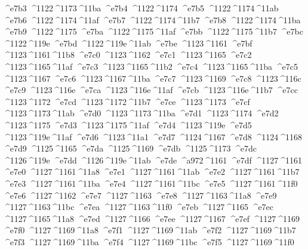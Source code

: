 \checkit ^^^^e7b3 ^^^^1122^^^^1173^^^^11ba
\checkit ^^^^e7b4 ^^^^1122^^^^1174
\checkit ^^^^e7b5 ^^^^1122^^^^1174^^^^11ab
\checkit ^^^^e7b6 ^^^^1122^^^^1174^^^^11af
\checkit ^^^^e7b7 ^^^^1122^^^^1174^^^^11b7
\checkit ^^^^e7b8 ^^^^1122^^^^1174^^^^11ba
\checkit ^^^^e7b9 ^^^^1122^^^^1175
\checkit ^^^^e7ba ^^^^1122^^^^1175^^^^11af
\checkit ^^^^e7bb ^^^^1122^^^^1175^^^^11b7
\checkit ^^^^e7bc ^^^^1122^^^^119e
\checkit ^^^^e7bd ^^^^1122^^^^119e^^^^11ab
\checkit ^^^^e7be ^^^^1123^^^^1161
\checkit ^^^^e7bf ^^^^1123^^^^1161^^^^11b8
\checkit ^^^^e7c0 ^^^^1123^^^^1162
\checkit ^^^^e7c1 ^^^^1123^^^^1165
\checkit ^^^^e7c2 ^^^^1123^^^^1165^^^^11af
\checkit ^^^^e7c3 ^^^^1123^^^^1165^^^^11b2
\checkit ^^^^e7c4 ^^^^1123^^^^1165^^^^11ba
\checkit ^^^^e7c5 ^^^^1123^^^^1167
\checkit ^^^^e7c6 ^^^^1123^^^^1167^^^^11ba
\checkit ^^^^e7c7 ^^^^1123^^^^1169
\checkit ^^^^e7c8 ^^^^1123^^^^116c
\checkit ^^^^e7c9 ^^^^1123^^^^116e
\checkit ^^^^e7ca ^^^^1123^^^^116e^^^^11af
\checkit ^^^^e7cb ^^^^1123^^^^116e^^^^11b7
\checkit ^^^^e7cc ^^^^1123^^^^1172
\checkit ^^^^e7cd ^^^^1123^^^^1172^^^^11b7
\checkit ^^^^e7ce ^^^^1123^^^^1173
\checkit ^^^^e7cf ^^^^1123^^^^1173^^^^11ab
\checkit ^^^^e7d0 ^^^^1123^^^^1173^^^^11ba
\checkit ^^^^e7d1 ^^^^1123^^^^1174
\checkit ^^^^e7d2 ^^^^1123^^^^1175
\checkit ^^^^e7d3 ^^^^1123^^^^1175^^^^11af
\checkit ^^^^e7d4 ^^^^1123^^^^119e
\checkit ^^^^e7d5 ^^^^1123^^^^119e^^^^11af
\checkit ^^^^e7d6 ^^^^1123^^^^11a1
\checkit ^^^^e7d7 ^^^^1124^^^^1167
\checkit ^^^^e7d8 ^^^^1124^^^^1168
\checkit ^^^^e7d9 ^^^^1125^^^^1165
\checkit ^^^^e7da ^^^^1125^^^^1169
\checkit ^^^^e7db ^^^^1125^^^^1173
\checkit ^^^^e7dc ^^^^1126^^^^119e
\checkit ^^^^e7dd ^^^^1126^^^^119e^^^^11ab
\checkit ^^^^e7de ^^^^a972^^^^1161
\checkit ^^^^e7df ^^^^1127^^^^1161
\checkit ^^^^e7e0 ^^^^1127^^^^1161^^^^11a8
\checkit ^^^^e7e1 ^^^^1127^^^^1161^^^^11ab
\checkit ^^^^e7e2 ^^^^1127^^^^1161^^^^11b7
\checkit ^^^^e7e3 ^^^^1127^^^^1161^^^^11ba
\checkit ^^^^e7e4 ^^^^1127^^^^1161^^^^11bc
\checkit ^^^^e7e5 ^^^^1127^^^^1161^^^^11f0
\checkit ^^^^e7e6 ^^^^1127^^^^1162
\checkit ^^^^e7e7 ^^^^1127^^^^1163
\checkit ^^^^e7e8 ^^^^1127^^^^1163^^^^11a8
\checkit ^^^^e7e9 ^^^^1127^^^^1163^^^^11bc
\checkit ^^^^e7ea ^^^^1127^^^^1163^^^^11f0
\checkit ^^^^e7eb ^^^^1127^^^^1165
\checkit ^^^^e7ec ^^^^1127^^^^1165^^^^11a8
\checkit ^^^^e7ed ^^^^1127^^^^1166
\checkit ^^^^e7ee ^^^^1127^^^^1167
\checkit ^^^^e7ef ^^^^1127^^^^1169
\checkit ^^^^e7f0 ^^^^1127^^^^1169^^^^11a8
\checkit ^^^^e7f1 ^^^^1127^^^^1169^^^^11ab
\checkit ^^^^e7f2 ^^^^1127^^^^1169^^^^11b7
\checkit ^^^^e7f3 ^^^^1127^^^^1169^^^^11ba
\checkit ^^^^e7f4 ^^^^1127^^^^1169^^^^11bc
\checkit ^^^^e7f5 ^^^^1127^^^^1169^^^^11f0
